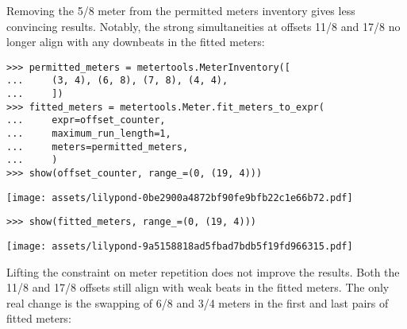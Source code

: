\noindent Removing the 5/8 meter from the permitted meters inventory gives less
convincing results. Notably, the strong simultaneities at offsets 11/8 and 17/8
no longer align with any downbeats in the fitted meters:

\begin{comment}
<abjad>
permitted_meters = metertools.MeterInventory([
    (3, 4), (6, 8), (7, 8), (4, 4),
    ])
fitted_meters = metertools.Meter.fit_meters_to_expr(
    expr=offset_counter,
    maximum_run_length=1,
    meters=permitted_meters,
    )
show(offset_counter, range_=(0, (19, 4)))
show(fitted_meters, range_=(0, (19, 4)))
</abjad>
\end{comment}

\begin{abjadbookoutput}
\begin{singlespacing}
\vspace{-0.5\baselineskip}
\begin{verbatim}
>>> permitted_meters = metertools.MeterInventory([
...     (3, 4), (6, 8), (7, 8), (4, 4),
...     ])
>>> fitted_meters = metertools.Meter.fit_meters_to_expr(
...     expr=offset_counter,
...     maximum_run_length=1,
...     meters=permitted_meters,
...     )
>>> show(offset_counter, range_=(0, (19, 4)))
\end{verbatim}
\noindent\texttt{[image: assets/lilypond-0be2900a4872bf90fe9bfb22c1e66b72.pdf]}
\begin{verbatim}
>>> show(fitted_meters, range_=(0, (19, 4)))
\end{verbatim}
\noindent\texttt{[image: assets/lilypond-9a5158818ad5fbad7bdb5f19fd966315.pdf]}
\end{singlespacing}
\end{abjadbookoutput}

\noindent Lifting the constraint on meter repetition does not improve the
results. Both the 11/8 and 17/8 offsets still align with weak beats in the
fitted meters. The only real change is the swapping of 6/8 and 3/4 meters in
the first and last pairs of fitted meters:

\begin{comment}
<abjad>
fitted_meters = metertools.Meter.fit_meters_to_expr(
    expr=offset_counter,
    meters=permitted_meters,
    )
show(offset_counter, range_=(0, (19, 4)))
show(fitted_meters, range_=(0, (19, 4)))
</abjad>
\end{comment}

